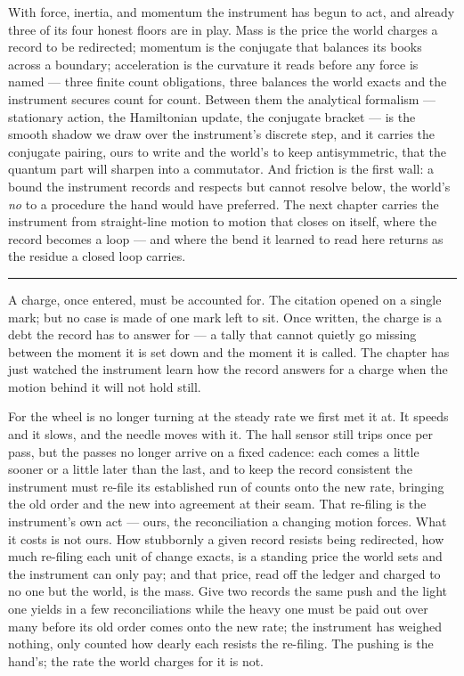 \bigskip

With force, inertia, and momentum the instrument has begun to act, and already three of its four honest floors
are in play. Mass is the price the world charges a record to be redirected; momentum is the conjugate that
balances its books across a boundary; acceleration is the curvature it reads before any force is named --- three
finite count obligations, three balances the world exacts and the instrument secures count for count. Between
them the analytical formalism --- stationary action, the Hamiltonian update, the conjugate bracket --- is the
smooth shadow we draw over the instrument's discrete step, and it carries the conjugate pairing, ours to write
and the world's to keep antisymmetric, that the quantum part will sharpen into a commutator. And friction is
the first wall: a bound the instrument records and respects but cannot resolve below, the world's \emph{no} to
a procedure the hand would have preferred.
The next chapter carries the instrument from straight-line motion to motion that closes on itself, where the
record becomes a loop --- and where the bend it learned to read here returns as the residue a closed loop
carries.

\bigskip
\begin{center}
\rule{0.4\textwidth}{0.4pt}
\end{center}
\bigskip

\noindent A charge, once entered, must be accounted for. The citation opened on a single mark; but no case
is made of one mark left to sit. Once written, the charge is a debt the record has to answer for --- a tally
that cannot quietly go missing between the moment it is set down and the moment it is called. The chapter has
just watched the instrument learn how the record answers for a charge when the motion behind it will not hold
still.

For the wheel is no longer turning at the steady rate we first met it at. It speeds and it slows, and the
needle moves with it. The hall sensor still trips once per pass, but the passes no longer arrive on a fixed
cadence: each comes a little sooner or a little later than the last, and to keep the record consistent the
instrument must re-file its established run of counts onto the new rate, bringing the old order and the new into
agreement at their seam. That re-filing is the instrument's own act --- ours, the reconciliation a changing
motion forces. What it costs is not ours. How stubbornly a given record resists being redirected, how much
re-filing each unit of change exacts, is a standing price the world sets and the instrument can only pay; and
that price, read off the ledger and charged to no one but the world, is the mass. Give two records the same
push and the light one yields in a few reconciliations while the heavy one must be paid out over many before its
old order comes onto the new rate; the instrument has weighed nothing, only counted how dearly each resists the
re-filing. The pushing is the hand's; the rate the world charges for it is not.

